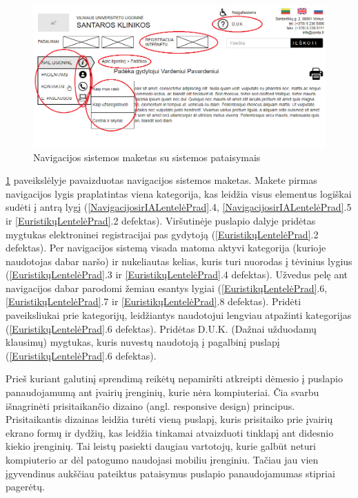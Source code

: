 \documentclass{VUMIFPSkursinis}
\begin{document}
\begin{figure}[H]
    \centering
    \includegraphics[scale=0.65]{img/NavigacijosPrototipas}
    \caption{Navigacijos sistemos maketas su sistemos pataisymais}
    \label{img:NavigacijosPrototipas}
\end{figure}

\ref{img:NavigacijosPrototipas} paveikslėlyje pavaizduotas navigacijos sistemos maketas. Makete pirmas navigacijos lygis praplatintas viena kategorija, kas leidžia visus elementus logiškai sudėti į antrą lygį (\ref{NavigacijosirIALentelėPrad}.4, \ref{NavigacijosirIALentelėPrad}.5 ir \ref{EuristikųLentelėPrad}.2 defektas). Viršutinėje puslapio dalyje pridėtas mygtukas elektroninei registracijai pas gydytoją (\ref{EuristikųLentelėPrad}.2 defektas). Per navigacijos sistemą visada matoma aktyvi kategorija (kurioje naudotojas dabar naršo) ir nukeliautas kelias, kuris turi nuorodas į tėvinius lygius (\ref{EuristikųLentelėPrad}.3 ir \ref{EuristikųLentelėPrad}.4 defektas). Užvedus pelę ant navigacijos dabar parodomi žemiau esantys lygiai (\ref{EuristikųLentelėPrad}.6, \ref{EuristikųLentelėPrad}.7 ir \ref{EuristikųLentelėPrad}.8 defektas). Pridėti paveiksliukai prie kategorijų, leidžiantys naudotojui lengviau atpažinti kategorijas (\ref{EuristikųLentelėPrad}.6 defektas). Pridėtas D.U.K. (Dažnai užduodamų klausimų) mygtukas, kuris nuvestų naudotoją į pagalbinį puslapį (\ref{EuristikųLentelėPrad}.6 defektas).

Prieš kuriant galutinį sprendimą reikėtų nepamiršti atkreipti dėmesio į puslapio panaudojamumą ant įvairių įrenginių, kurie nėra kompiuteriai. Čia svarbu išnagrinėti prisitaikančio dizaino (angl. responsive design) principus. Prisitaikantis dizainas leidžia turėti vieną puslapį, kuris prisitaiko prie įvairių ekrano formų ir dydžių\cite{RWDEn}, kas leidžia tinkamai atvaizduoti tinklapį ant didesnio kiekio įrenginių. Tai leistų pasiekti daugiau vartotojų, kurie galbūt neturi kompiuterio ar dėl patogumo naudojasi mobiliu įrenginiu. Tačiau jau vien įgyvendinus aukščiau pateiktus pataisymus puslapio panaudojamumas stipriai pagerėtų.
\end{document}

